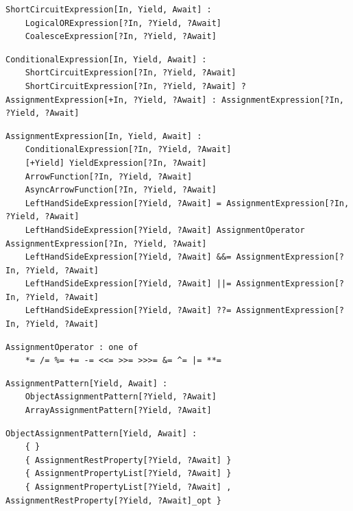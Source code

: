 \noindent\textbf{\texttt{}}\par
\begin{lstlisting}
ShortCircuitExpression[In, Yield, Await] :
    LogicalORExpression[?In, ?Yield, ?Await]
    CoalesceExpression[?In, ?Yield, ?Await]
\end{lstlisting}

\noindent\textbf{\texttt{}}\par
\begin{lstlisting}
ConditionalExpression[In, Yield, Await] :
    ShortCircuitExpression[?In, ?Yield, ?Await]
    ShortCircuitExpression[?In, ?Yield, ?Await] ? AssignmentExpression[+In, ?Yield, ?Await] : AssignmentExpression[?In, ?Yield, ?Await]
\end{lstlisting}

\noindent\textbf{\texttt{}}\par
\begin{lstlisting}
AssignmentExpression[In, Yield, Await] :
    ConditionalExpression[?In, ?Yield, ?Await]
    [+Yield] YieldExpression[?In, ?Await]
    ArrowFunction[?In, ?Yield, ?Await]
    AsyncArrowFunction[?In, ?Yield, ?Await]
    LeftHandSideExpression[?Yield, ?Await] = AssignmentExpression[?In, ?Yield, ?Await]
    LeftHandSideExpression[?Yield, ?Await] AssignmentOperator AssignmentExpression[?In, ?Yield, ?Await]
    LeftHandSideExpression[?Yield, ?Await] &&= AssignmentExpression[?In, ?Yield, ?Await]
    LeftHandSideExpression[?Yield, ?Await] ||= AssignmentExpression[?In, ?Yield, ?Await]
    LeftHandSideExpression[?Yield, ?Await] ??= AssignmentExpression[?In, ?Yield, ?Await]
\end{lstlisting}

\noindent\textbf{\texttt{}}\par
\begin{lstlisting}
AssignmentOperator : one of
    *= /= %= += -= <<= >>= >>>= &= ^= |= **=
\end{lstlisting}

\noindent\textbf{\texttt{}}\par
\begin{lstlisting}
AssignmentPattern[Yield, Await] :
    ObjectAssignmentPattern[?Yield, ?Await]
    ArrayAssignmentPattern[?Yield, ?Await]
\end{lstlisting}

\noindent\textbf{\texttt{}}\par
\begin{lstlisting}
ObjectAssignmentPattern[Yield, Await] :
    { }
    { AssignmentRestProperty[?Yield, ?Await] }
    { AssignmentPropertyList[?Yield, ?Await] }
    { AssignmentPropertyList[?Yield, ?Await] , AssignmentRestProperty[?Yield, ?Await]_opt }
\end{lstlisting}

